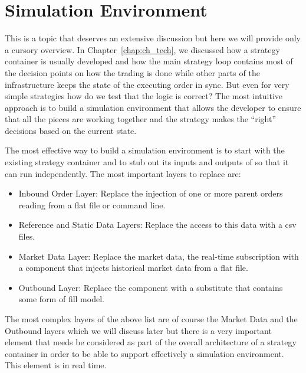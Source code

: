\section{Simulation Environment}


This is a topic that deserves an extensive discussion but here we will provide only a cursory overview. In Chapter~\ref{chap:ch_tech}, we discussed how a strategy container is usually developed and how the main strategy loop contains most of the decision points on how the trading is done while other parts of the infrastructure keeps the state of the executing order in sync. But even for very simple strategies how do we test that the logic is correct? The most intuitive approach is to build a simulation environment that allows the developer to ensure that all the pieces are working together and the strategy makes the ``right'' decisions based on the current state. 


The most effective way to build a simulation environment is to start with the existing strategy container and to stub out its inputs and outputs of so that it can run independently.  The most important layers to replace are:
        \begin{itemize}
        \item Inbound Order Layer: Replace the injection of one or more parent orders reading from a flat file or command line.
        \item Reference and Static Data Layers: Replace the access to this data with a csv files.
        \item Market Data Layer: Replace the market data, the real-time subscription with a component that injects historical market data from a flat file.
        \item Outbound Layer: Replace the component with a substitute that contains some form of fill model.
        \end{itemize}

The most complex layers of the above list are of course the Market Data and the Outbound layers which we will discuss later but there is a very important element that needs be considered as part of the overall architecture of a strategy container in order to be able to support effectively a simulation environment. This element is in real time. \twomedskip


